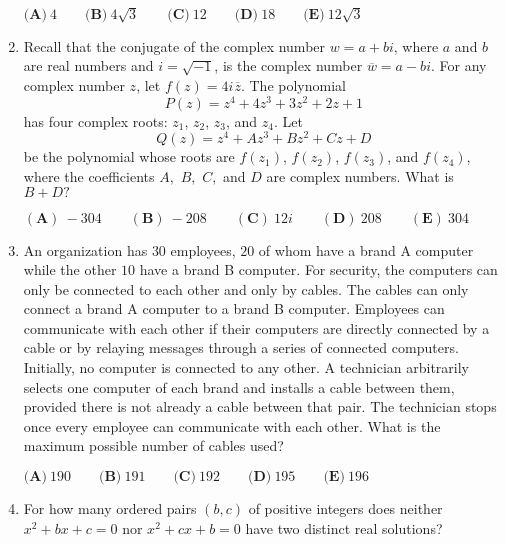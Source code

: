 \documentclass{article}
\begin{document}
\begin{enumerate}[label=\arabic*., itemsep=0.5em]
$\textbf{(A)} \: 4 \qquad \textbf{(B)} \: 4\sqrt3 \qquad \textbf{(C)} \: 12 \qquad \textbf{(D)} \: 18 \qquad \textbf{(E)} \: 12\sqrt3$\par \vspace{0.5em}\item Recall that the conjugate of the complex number $w = a + bi$, where $a$ and $b$ are real numbers and $i = \sqrt{-1}$, is the complex number $\overline{w} = a - bi$. For any complex number $z$, let $f(z) = 4i\hspace{1pt}\overline{z}$. The polynomial 
\begin{equation*}
P(z) = z^4 + 4z^3 + 3z^2 + 2z + 1
\end{equation*}
 has four complex roots: $z_1$, $z_2$, $z_3$, and $z_4$. Let 
\begin{equation*}
Q(z) = z^4 + Az^3 + Bz^2 + Cz + D
\end{equation*}
 be the polynomial whose roots are $f(z_1)$, $f(z_2)$, $f(z_3)$, and $f(z_4)$, where the coefficients $A,$ $B,$ $C,$ and $D$ are complex numbers. What is $B + D?$

$(\textbf{A})\: {-}304\qquad(\textbf{B}) \: {-}208\qquad(\textbf{C}) \: 12i\qquad(\textbf{D}) \: 208\qquad(\textbf{E}) \: 304$\par \vspace{0.5em}\item An organization has $30$ employees, $20$ of whom have a brand A computer while the other $10$ have a brand B computer. For security, the computers can only be connected to each other and only by cables. The cables can only connect a brand A computer to a brand B computer. Employees can communicate with each other if their computers are directly connected by a cable or by relaying messages through a series of connected computers. Initially, no computer is connected to any other. A technician arbitrarily selects one computer of each brand and installs a cable between them, provided there is not already a cable between that pair. The technician stops once every employee can communicate with each other. What is the maximum possible number of cables used?

$\textbf{(A)}\ 190  \qquad\textbf{(B)}\  191 \qquad\textbf{(C)}\  192 \qquad\textbf{(D)}\
 195 \qquad\textbf{(E)}\ 196$\par \vspace{0.5em}\item For how many ordered pairs $(b,c)$ of positive integers does neither $x^2+bx+c=0$ nor $x^2+cx+b=0$ have two distinct real solutions?


\end{enumerate}
\end{document}

